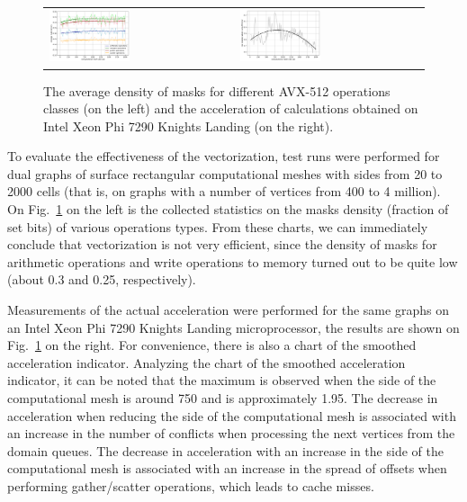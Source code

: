 \documentclass[
11pt,%
tightenlines,%
twoside,%
onecolumn,%
nofloats,%
nobibnotes,%
nofootinbib,%
superscriptaddress,%
noshowpacs,%
centertags]%
{revtex4}
\begin{document}
\begin{figure}[h]
\setcaptionmargin{5mm}
\onelinecaptionsfalse %
\begin{tabular}{ll}
\includegraphics[width=0.45\textwidth]{pics/chart_statistics_eng.png}
&
\includegraphics[width=0.45\textwidth]{pics/chart_speedup_eng.png}
\end{tabular}
\caption{The average density of masks for different AVX-512 operations classes (on the left) and the acceleration of calculations obtained on Intel Xeon Phi 7290 Knights Landing (on the right).}\label{fig:chart}
\end{figure}

To evaluate the effectiveness of the vectorization, test runs were performed for dual graphs of surface rectangular computational meshes with sides from 20 to 2000 cells (that is, on graphs with a number of vertices from 400 to 4 million).
On Fig.~\ref{fig:chart} on the left is the collected statistics on the masks density (fraction of set bits) of various operations types.
From these charts, we can immediately conclude that vectorization is not very efficient, since the density of masks for arithmetic operations and write operations to memory turned out to be quite low (about 0.3 and 0.25, respectively).

Measurements of the actual acceleration were performed for the same graphs on an Intel Xeon Phi 7290 Knights Landing microprocessor, the results are shown on Fig.~\ref{fig:chart} on the right.
For convenience, there is also a chart of the smoothed acceleration indicator.
Analyzing the chart of the smoothed acceleration indicator, it can be noted that the maximum is observed when the side of the computational mesh is around 750 and is approximately 1.95.
The decrease in acceleration when reducing the side of the computational mesh is associated with an increase in the number of conflicts when processing the next vertices from the domain queues.
The decrease in acceleration with an increase in the side of the computational mesh is associated with an increase in the spread of offsets when performing gather/scatter operations, which leads to cache misses.
\end{document}
